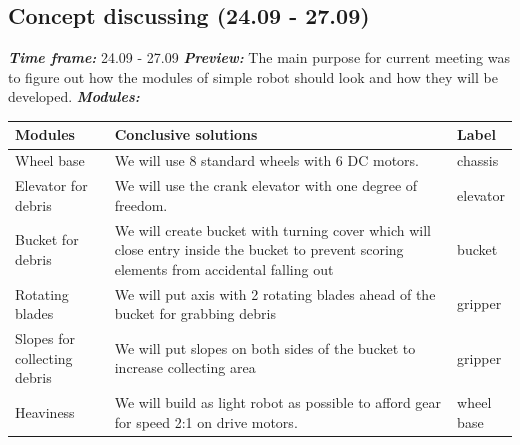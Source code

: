 \subsection{Concept discussing (24.09 - 27.09)}
	\textit{\textbf{Time frame:}} 24.09 - 27.09 \newline
	\textit{\textbf{Preview:}} The main purpose for current meeting was to figure out how the modules of simple robot should look and how they will be developed. \newline \newline
	\textit{\textbf{Modules:}}

  \begin{table}[H]
	\vspace{-2mm}
	\begin{center}
		\begin{tabular}{|p{0.2\linewidth}|p{0.7\linewidth}|p{0.1\linewidth}|}
			\hline
			Modules & Conclusive solutions & Label \\
			\hline
			Wheel base & We will use 8 standard wheels with 6 DC motors. & chassis \\
			\hline
			Elevator for debris & We will use the crank elevator with one degree of freedom. & elevator \\
			\hline
			Bucket for debris & We will create bucket with turning cover which will close entry inside the bucket to prevent scoring elements from accidental falling out & bucket \\
			\hline
			Rotating blades & We will put axis with 2 rotating blades ahead of the bucket for grabbing debris & gripper \\
			\hline
			Slopes for collecting debris & We will put slopes on both sides of the bucket to increase collecting area & gripper \\
			\hline
			Heaviness & We will build as light robot as possible to afford gear for speed 2:1 on drive motors. & wheel base \\
			\hline
		\end{tabular}
	\end{center}
  \end{table}
  
